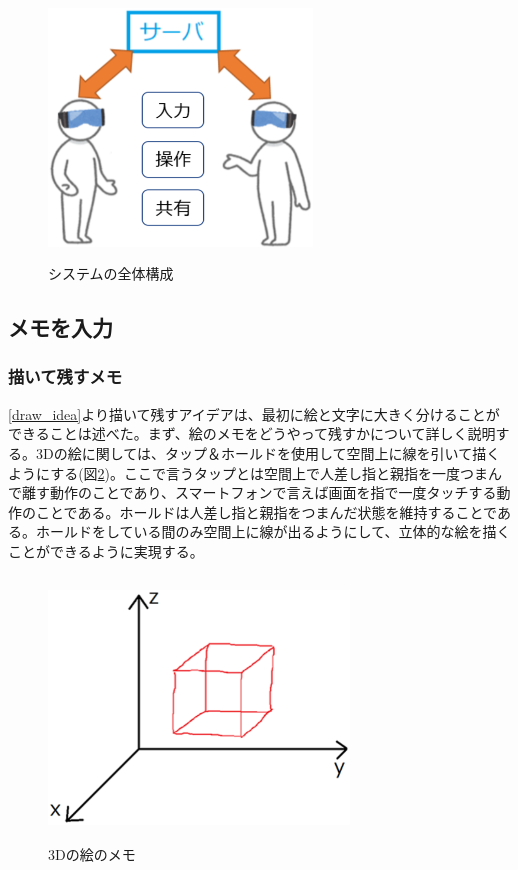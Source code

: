 \documentclass[11pt,a4j, titlepage]{jarticle} %
\begin{document}
\begin{figure}[H]
  \begin{center}
    \includegraphics[clip,height=7.0cm,width=7.0cm]{./systemzentai.eps}
    \caption{システムの全体構成}
    \label{fig:systemzentai}
  \end{center}
\end{figure}

\subsection{メモを入力}

\subsubsection{描いて残すメモ} \label{draw_memo}
\ref{draw_idea}より描いて残すアイデアは、最初に絵と文字に大きく分けることができることは述べた。まず、絵のメモをどうやって残すかについて詳しく説明する。3Dの絵に関しては、タップ＆ホールドを使用して空間上に線を引いて描くようにする(図\ref{fig:3d_draw})。ここで言うタップとは空間上で人差し指と親指を一度つまんで離す動作のことであり、スマートフォンで言えば画面を指で一度タッチする動作のことである。ホールドは人差し指と親指をつまんだ状態を維持することである。ホールドをしている間のみ空間上に線が出るようにして、立体的な絵を描くことができるように実現する。

\begin{figure}[H]
  \begin{center}
    \includegraphics[clip,height=7.0cm,width=8.0cm]{./3d_draw.eps}
    \caption{3Dの絵のメモ}
    \label{fig:3d_draw}
  \end{center}
\end{figure}
\end{document}
